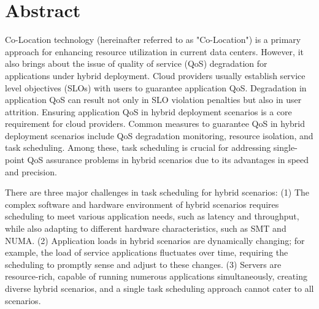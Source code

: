 \intobmk\chapter*{Abstract}%

Co-Location technology (hereinafter referred to as "Co-Location") is a primary approach for enhancing resource utilization in current data centers. However, it also brings about the issue of quality of service (QoS) degradation for applications under hybrid deployment. Cloud providers usually establish service level objectives (SLOs) with users to guarantee application QoS. Degradation in application QoS can result not only in SLO violation penalties but also in user attrition. Ensuring application QoS in hybrid deployment scenarios is a core requirement for cloud providers. Common measures to guarantee QoS in hybrid deployment scenarios include QoS degradation monitoring, resource isolation, and task scheduling. Among these, task scheduling is crucial for addressing single-point QoS assurance problems in hybrid scenarios due to its advantages in speed and precision.

There are three major challenges in task scheduling for hybrid scenarios: (1) The complex software and hardware environment of hybrid scenarios requires scheduling to meet various application needs, such as latency and throughput, while also adapting to different hardware characteristics, such as SMT and NUMA. (2) Application loads in hybrid scenarios are dynamically changing; for example, the load of service applications fluctuates over time, requiring the scheduling to promptly sense and adjust to these changes. (3) Servers are resource-rich, capable of running numerous applications simultaneously, creating diverse hybrid scenarios, and a single task scheduling approach cannot cater to all scenarios.

